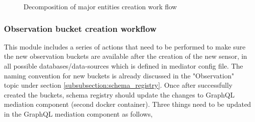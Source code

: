 \begin{figure}[!htbp]
{		}
			\hfill
		\caption{Decomposition of major entities creation work flow}
		\label{fig:dummy}
	\end{figure}

	\subsubsection{Observation bucket creation workflow} \label{subsubsection:observation_bucket}
	This module includes a series of actions that need to be performed to make sure the new observation buckets are available after the creation of the new sensor, in all possible databases/data-sources which is defined in mediator config file. The naming convention for new buckets is already discussed in the "Observation" topic under section \ref{subsubsection:schema_registry}. Once after successfully created the buckets, schema registry should update the changes to GraphQL mediation component (second docker container). Three things need to be updated in the GraphQL mediation component as follows,
	
